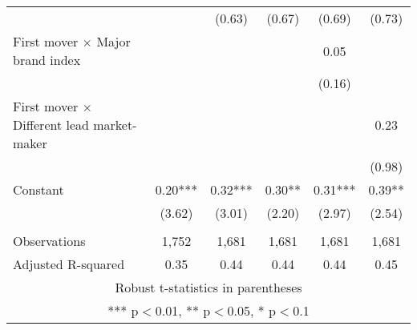 \documentclass[]{article}
\begin{document}
\begin{tabular}{lccccc}
 &  & (0.63) & (0.67) & (0.69) & (0.73) \\
First mover $\times$ Major brand index &  &  &  & 0.05 &  \\
 &  &  &  & (0.16) &  \\
First mover $\times$ Different lead market-maker &  &  &  &  & 0.23 \\
 &  &  &  &  & (0.98) \\
Constant & 0.20*** & 0.32*** & 0.30** & 0.31*** & 0.39** \\
 & (3.62) & (3.01) & (2.20) & (2.97) & (2.54) \\
 &  &  &  &  &  \\
Observations & 1,752 & 1,681 & 1,681 & 1,681 & 1,681 \\
 Adjusted R-squared & 0.35 & 0.44 & 0.44 & 0.44 & 0.45 \\ \hline
\multicolumn{6}{c}{ Robust t-statistics in parentheses} \\
\multicolumn{6}{c}{ *** p$<$0.01, ** p$<$0.05, * p$<$0.1} \\
\end{tabular}
\end{document}
